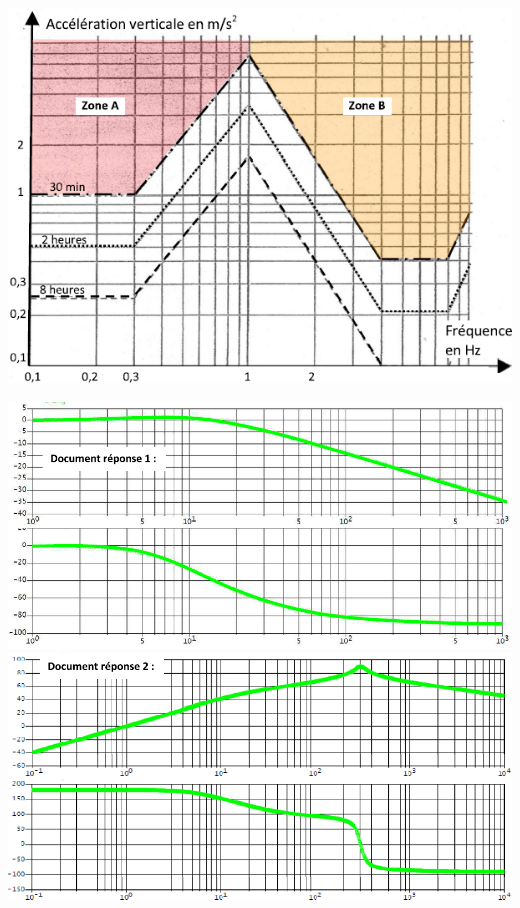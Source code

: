 \documentclass[10pt,fleqn]{article} %
\begin{document}
\begin{multicols}{2}
\begin{center}
\includegraphics[width=\linewidth]{images/img_07}
\end{center}


\ifprof
\else
\end{multicols}
\fi


\begin{center}
\includegraphics[width=\linewidth]{images/img_08}
\includegraphics[width=\linewidth]{images/img_09}
\end{center}
\end{document}

